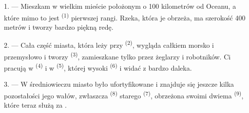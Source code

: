 %
%
%

\VUsaut{2.0mm}
\VUsaut{3.0mm}
\VUfilet{16mm}
\VUsaut{5.6mm}
\VUsaut{1.4mm}
\VUsaut{2.2mm}

\VUsaut{3.0mm}

1. --- Mieszkam w wielkim mieście położonym o 100 kilometrów od Oceanu, a które mimo to
jest  \textsuperscript{(1)} pierwszej rangi. Rzeka, która je obrzeża, ma
szerokość 400 metrów i tworzy bardzo piękną redę.

2. --- Cała część miasta, która leży przy  \textsuperscript{(2)},
wygląda całkiem morsko i przemysłowo i tworzy 
\textsuperscript{(3)}, zamieszkane tylko przez żeglarzy i robotników. Ci pracują w
 \textsuperscript{(4)} i w  \textsuperscript{(5)},
której wysoki  \textsuperscript{(6)} i  widać z bardzo
daleka.

3. --- W średniowieczu miasto było ufortyfikowane i znajduje się jeszcze kilka
pozostałości jego wałów, zwłaszcza  \textsuperscript{(8)} starego
 \textsuperscript{(7)}, obrzeżona swoimi dwiema 
\textsuperscript{(9)}, które teraz służą za .

